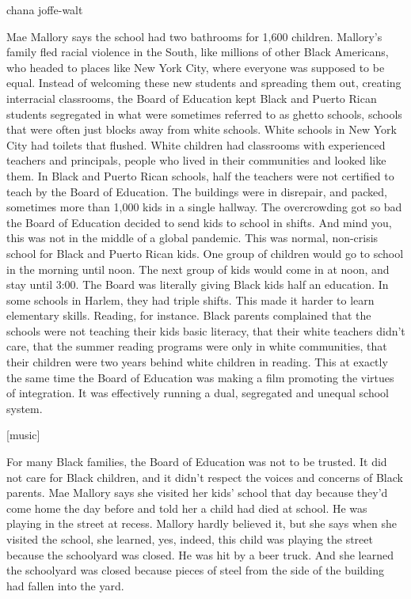 chana joffe-walt

Mae Mallory says the school had two bathrooms for 1,600 children.
Mallory's family fled racial violence in the South, like millions of
other Black Americans, who headed to places like New York City, where
everyone was supposed to be equal. Instead of welcoming these new
students and spreading them out, creating interracial classrooms, the
Board of Education kept Black and Puerto Rican students segregated in
what were sometimes referred to as ghetto schools, schools that were
often just blocks away from white schools. White schools in New York
City had toilets that flushed. White children had classrooms with
experienced teachers and principals, people who lived in their
communities and looked like them. In Black and Puerto Rican schools,
half the teachers were not certified to teach by the Board of Education.
The buildings were in disrepair, and packed, sometimes more than 1,000
kids in a single hallway. The overcrowding got so bad the Board of
Education decided to send kids to school in shifts. And mind you, this
was not in the middle of a global pandemic. This was normal, non-crisis
school for Black and Puerto Rican kids. One group of children would go
to school in the morning until noon. The next group of kids would come
in at noon, and stay until 3:00. The Board was literally giving Black
kids half an education. In some schools in Harlem, they had triple
shifts. This made it harder to learn elementary skills. Reading, for
instance. Black parents complained that the schools were not teaching
their kids basic literacy, that their white teachers didn't care, that
the summer reading programs were only in white communities, that their
children were two years behind white children in reading. This at
exactly the same time the Board of Education was making a film promoting
the virtues of integration. It was effectively running a dual,
segregated and unequal school system.

{[}music{]}

For many Black families, the Board of Education was not to be trusted.
It did not care for Black children, and it didn't respect the voices and
concerns of Black parents. Mae Mallory says she visited her kids' school
that day because they'd come home the day before and told her a child
had died at school. He was playing in the street at recess. Mallory
hardly believed it, but she says when she visited the school, she
learned, yes, indeed, this child was playing the street because the
schoolyard was closed. He was hit by a beer truck. And she learned the
schoolyard was closed because pieces of steel from the side of the
building had fallen into the yard.

